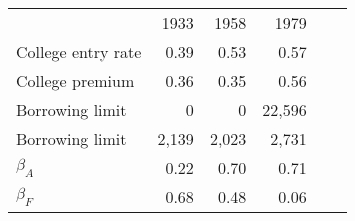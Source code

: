 \begin{tabular}{lrrrrr}
\hline
 & 1933  & 1958  & 1979  &   &   \\ 
College entry rate & 0.39  & 0.53  & 0.57  &   &   \\ 
College premium & 0.36  & 0.35  & 0.56  &   &   \\ 
Borrowing limit & 0  & 0  & 22,596  &   &   \\ 
Borrowing limit & 2,139  & 2,023  & 2,731  &   &   \\ 
\hline
$\beta_{A}$ & 0.22  & 0.70  & 0.71  &   &   \\ 
$\beta_{F}$ & 0.68  & 0.48  & 0.06  &   &   \\ 
\hline
\end{tabular}%
